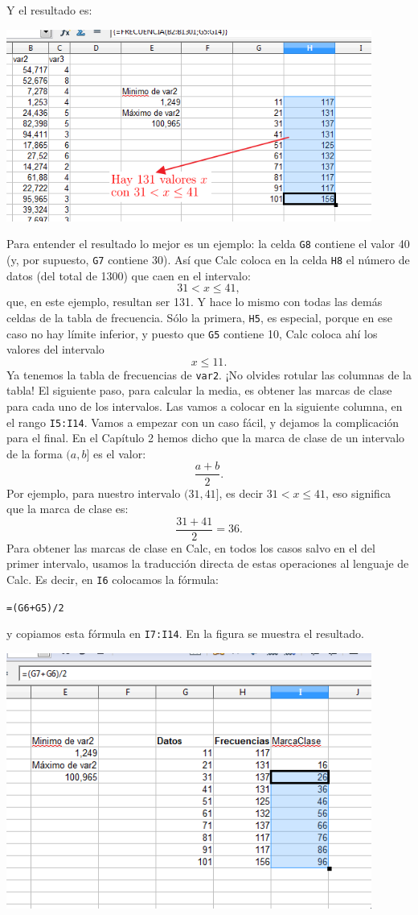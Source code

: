 \documentclass[10pt,a4paper]{article}\usepackage[]{graphicx}\usepackage[]{color}
\newcounter {cont01}
\begin{document}
Y el resultado es:
    \begin{center}
    \includegraphics[width=12cm]{../fig/Tut02-32.png}
    \end{center}
Para entender el resultado lo mejor es un ejemplo: la celda {\tt G8} contiene el valor 40 (y, por supuesto, {\tt G7} contiene 30). Así que Calc coloca en la celda {\tt H8} el número de datos (del total de 1300) que caen en el intervalo:
\[31 < x \leq 41,\]
que, en este ejemplo, resultan ser 131. Y hace lo mismo con todas las demás celdas de la tabla de frecuencia. Sólo la primera, {\tt H5}, es especial, porque en ese caso no hay límite inferior, y puesto que {\tt G5} contiene 10, Calc coloca ahí los valores del intervalo
\[x \leq 11.\]
Ya tenemos la tabla de frecuencias de {\tt var2}. ¡No olvides rotular las columnas de la tabla! El siguiente paso, para calcular la media, es obtener las {\sf marcas de clase} para cada uno de los intervalos. Las vamos a colocar en la siguiente columna, en el rango {\tt I5:I14}. Vamos a empezar con un caso fácil, y dejamos la complicación para el final. En el Capítulo 2 hemos dicho que la marca de clase de un intervalo de la forma $(a,b]$ es el valor:
\[\dfrac{a+b}{2}.\]
Por ejemplo, para nuestro intervalo $(31,41]$, es decir $31 < x \leq 41$, eso significa que la marca de clase es:
\[\dfrac{31+41}{2}=36.\]
Para obtener las marcas de clase en Calc, en todos los casos salvo en el del primer intervalo, usamos la traducción directa de estas operaciones al lenguaje de Calc. Es decir, en {\tt I6} colocamos la fórmula:
\begin{center}
{\tt =(G6+G5)/2}
\end{center}
y copiamos esta fórmula en {\tt I7:I14}. En la figura se muestra el resultado.
    \begin{center}
    \includegraphics[width=12cm]{../fig/Tut02-33.png}
    \end{center}
\end{document}
